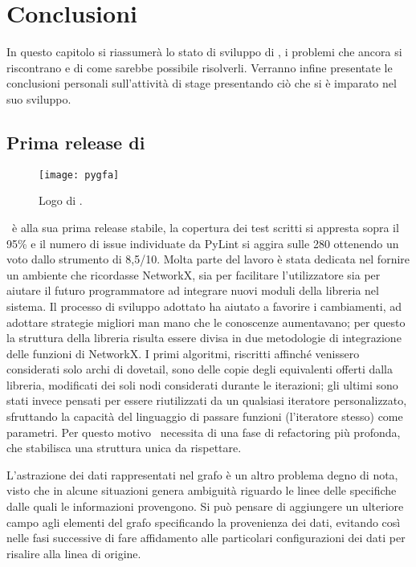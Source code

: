 \chapter{Conclusioni}
In questo capitolo si riassumerà lo stato di sviluppo
di \pygfa, i problemi che ancora si riscontrano e di come
sarebbe possibile risolverli. Verranno infine presentate
le conclusioni personali sull'attività di stage presentando
ciò che si è imparato nel suo sviluppo.

\section{Prima release di \pygfa}
\begin{wrapfigure} {O} {0.4\linewidth}
	\begin{centering}	
		\texttt{[image: pygfa]}
		\caption[Logo di \pygfa]{Logo di \pygfa.}
	\end{centering}
\end{wrapfigure}
\pygfa \   è alla sua prima release stabile, la copertura dei test
scritti si appresta sopra il 95\% e il numero di issue individuate
da PyLint si aggira sulle 280 ottenendo un voto dallo strumento
di 8,5/10.
Molta parte del lavoro è stata dedicata nel fornire un
ambiente che ricordasse NetworkX, sia per facilitare l'utilizzatore
sia per aiutare il futuro programmatore ad integrare nuovi moduli
della libreria nel sistema.
Il processo di sviluppo adottato ha aiutato a favorire i cambiamenti,
ad adottare strategie migliori man mano che le conoscenze aumentavano;
per questo la struttura della libreria risulta essere divisa in due metodologie
di integrazione delle funzioni di NetworkX. I primi algoritmi, riscritti
affinché venissero considerati solo archi di dovetail, sono delle
copie degli equivalenti offerti dalla libreria, modificati dei soli
nodi considerati durante le iterazioni; gli ultimi
sono stati invece pensati per essere riutilizzati da un qualsiasi iteratore
personalizzato, sfruttando la capacità del linguaggio di passare
funzioni (l'iteratore stesso) come parametri. Per questo motivo
\pygfa \  necessita di una fase di refactoring più profonda, che stabilisca
una struttura unica da rispettare.

L'astrazione dei dati rappresentati nel grafo è un altro problema
degno di nota, visto che in alcune situazioni genera ambiguità riguardo
le linee delle specifiche dalle quali le informazioni provengono.
Si può pensare di aggiungere un ulteriore campo agli elementi del grafo
specificando la provenienza dei dati, evitando così nelle fasi successive
di fare affidamento alle particolari configurazioni dei dati per risalire
alla linea di origine.

